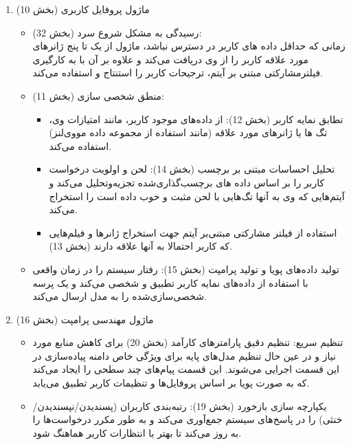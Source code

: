\begin{enumerate}
\item
 ماژول پروفایل کاربری (بخش 10)
\begin{itemize}
\item
رسیدگی به مشکل شروع سرد (بخش 32):\\
 زمانی که حداقل داده های کاربر در دسترس نباشد، ماژول از یک تا پنج ژانرهای مورد علاقه کاربر را از وی دریافت می‌کند و علاوه بر آن با به کارگیری فیلترمشارکتی مبتنی بر آیتم،  ترجیحات کاربر را استنتاج و استفاده می‌کند.
\item
منطق شخصی سازی (بخش 11):
\begin{itemize}
\item
تطابق نمایه کاربر (بخش 12): از داده‌های موجود کاربر، مانند امتیازات وی، تگ ها یا ژانرهای مورد علاقه (مانند استفاده از مجموعه داده مووی‌لنز) استفاده می‌کند.
\item
تحلیل احساسات مبتنی بر برچسب (بخش 14): لحن و اولویت درخواست کاربر را بر اساس داده های برچسب‌گذاری‌شده تجزیه‌وتحلیل می‌کند و آیتم‌هایی که وی به آنها تگ‌هایی با لحن مثبت و خوب داده است را استخراج می‌کند.
\item
استفاده از فیلتر مشارکتی مبتنی‌بر آیتم جهت استخراج ژانرها و فیلم‌هایی که کاربر احتمالا به آنها علاقه دارند (بخش 13).
\end{itemize}

\item
تولید داده‌های پویا و تولید پرامپت (بخش 15): رفتار سیستم را در زمان واقعی با استفاده از داده‌های نمایه کاربر تطبیق و شخصی می‌کند و یک پرسه شخصی‌سازی‌شده را به مدل ارسال می‌کند.
\end{itemize}


\item
ماژول مهندسی پرامپت (بخش 16)
\begin{itemize}
\item
تنظیم سریع: 
تنظیم دقیق پارامترهای کارآمد%
 (بخش 20) برای کاهش منابع مورد نیاز و در عین حال تنظیم مدل‌های پایه برای ویژگی خاص دامنه پیاده‌سازی در این قسمت اجرایی می‌شوند. این قسمت پیام‌های چند سطحی را ایجاد می‌کند که به صورت پویا بر اساس پروفایل‌ها و تنظیمات کاربر تطبیق می‌یابد.
\item
یکپارچه سازی بازخورد (بخش 19):
رتبه‌بندی کاربران (پسندیدن/نپسندیدن/خنثی) را در پاسخ‌های سیستم جمع‌آوری می‌کند و به طور مکرر درخواست‌ها را به روز می‌کند تا بهتر با انتظارات کاربر هماهنگ شود.
\end{itemize}


\end{enumerate}
